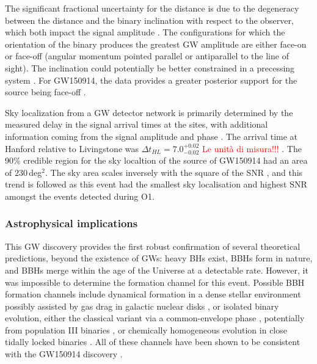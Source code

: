 \documentclass[binding=0.6cm, LaM]{sapthesis}
\newcommand{\fpg}[1]{\textcolor{red}{#1} }
\begin{document}
	The significant fractional uncertainty for the distance is due to the degeneracy between the distance and the binary inclination with respect to the observer, which both impact the signal amplitude \cite{96-98}.
	The configurations for which the orientation of the binary produces the greatest GW amplitude 
	are either face-on or face-off (angular momentum pointed parallel or antiparallel to the line of sight). 
	The inclination could potentially be better constrained in a precessing system \cite{94, 95}. 
	For GW150914, the data provides a greater posterior support for the source being face-off \cite{93}.

	Sky localization from a GW detector network is primarily determined by the measured delay in the signal arrival times at the sites, 
	with additional information coming from the signal amplitude and phase \cite{91,92}. 
	The arrival time at Hanford relative to Livingstone was $\Delta t_{HL} = 7.0^{+0.02}_{-0.02}$ \fpg{Le unit\`a di misura!!!}.
	The 90\% credible region for the sky localtion of the source of GW150914 had an area of $230\,$deg$^2$.
	The sky area scales inversely with the square of the SNR \cite{89,90}, 
	and this trend is followed as this event had the smallest sky localisation and 
	highest SNR amongst the events detected during O1.

	\subsubsection{Astrophysical implications}
	This GW discovery provides the first robust confirmation of several theoretical predictions, beyond the existence of GWs:
	heavy BHs exist, BBHs form in nature, and BBHs merge within the age of the Universe at a detectable rate. 
	However, it was impossible to determine the formation channel for this event. 
	Possible BBH formation channels include dynamical formation in a dense stellar environment \cite{84, 88} 
	possibly assisted by gas drag in galactic nuclear disks \cite{82, 83}, or isolated binary evolution, 
	either the classical variant via a common-envelope phase \cite{76-81}, 
	potentially from population III binaries \cite{74, 75}, or chemically homogeneous evolution 
	in close tidally locked binaries \cite{72, 73}. 
	All of these channels have been shown to be consistent with the GW150914 discovery \cite{63-70}. 
\end{document}

